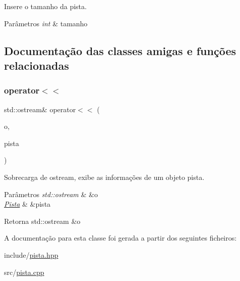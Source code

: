 Insere o tamanho da pista. 


\begin{DoxyParams}{Parâmetros}
{\em int} & tamanho \\
\hline
\end{DoxyParams}


\subsection{Documentação das classes amigas e funções relacionadas}
\mbox{\label{classPista_a22c7e3e6f6a5da426ab7e401e3567185}} 
\subsubsection{\texorpdfstring{operator$<$$<$}{operator<<}}
{\footnotesize\ttfamily std\+::ostream\& operator$<$$<$ (\begin{DoxyParamCaption}\item[{std\+::ostream \&}]{o,  }\item[{\hyperlink{classPista}{Pista} \&}]{pista }\end{DoxyParamCaption})\hspace{0.3cm}{\ttfamily [friend]}}



Sobrecarga de ostream, exibe as informações de um objeto pista. 


\begin{DoxyParams}{Parâmetros}
{\em std\+::ostream} & \&o \\
\hline
{\em \hyperlink{classPista}{Pista}} & \&pista \\
\hline
\end{DoxyParams}
\begin{DoxyReturn}{Retorna}
std\+::ostream \&o 
\end{DoxyReturn}


A documentação para esta classe foi gerada a partir dos seguintes ficheiros\+:\begin{DoxyCompactItemize}
\item 
include/\hyperlink{pista_8hpp}{pista.\+hpp}\item 
src/\hyperlink{pista_8cpp}{pista.\+cpp}\end{DoxyCompactItemize}

